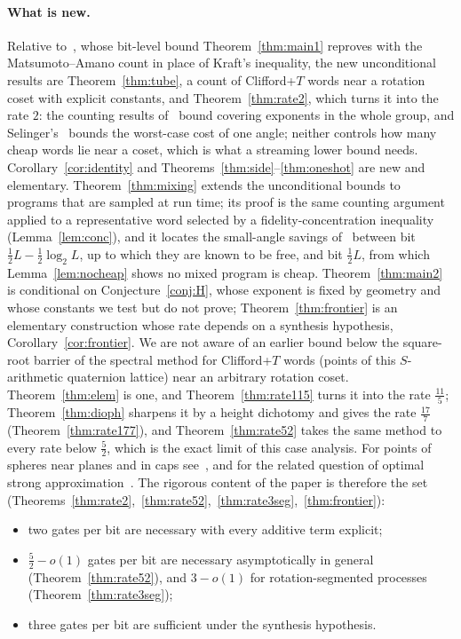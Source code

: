 \documentclass[aps,prx,twocolumn,superscriptaddress,nofootinbib,longbibliography]{revtex4-2}
\theoremstyle{plain}
\theoremstyle{definition}
\theoremstyle{remark}
\begin{document}
\paragraph{What is new.} Relative to~\cite{Paper1}, whose bit-level bound Theorem~\ref{thm:main1} reproves with the Matsumoto--Amano count in place of Kraft's inequality, the new unconditional results are Theorem~\ref{thm:tube}, a count of Clifford+$T$ words near a rotation coset with explicit constants, and Theorem~\ref{thm:rate2}, which turns it into the rate $2$: the counting results of~\cite{PS18} bound covering exponents in the whole group, and Selinger's~\cite[Thm.~30]{Selinger15} bounds the worst-case cost of one angle; neither controls how many cheap words lie near a coset, which is what a streaming lower bound needs. Corollary~\ref{cor:identity} and Theorems~\ref{thm:side}--\ref{thm:oneshot} are new and elementary. Theorem~\ref{thm:mixing} extends the unconditional bounds to programs that are sampled at run time; its proof is the same counting argument applied to a representative word selected by a fidelity-concentration inequality (Lemma~\ref{lem:conc}), and it locates the small-angle savings of~\cite{Bothe} between bit $\tfrac12L-\tfrac12\log_2L$, up to which they are known to be free, and bit $\tfrac12L$, from which Lemma~\ref{lem:nocheap} shows no mixed program is cheap. Theorem~\ref{thm:main2} is conditional on Conjecture~\ref{conj:H}, whose exponent is fixed by geometry and whose constants we test but do not prove; Theorem~\ref{thm:frontier} is an elementary construction whose rate depends on a synthesis hypothesis, Corollary~\ref{cor:frontier}. We are not aware of an earlier bound below the square-root barrier of the spectral method for Clifford+$T$ words (points of this $S$-arithmetic quaternion lattice) near an arbitrary rotation coset. Theorem~\ref{thm:elem} is one, and Theorem~\ref{thm:rate115} turns it into the rate $\tfrac{11}5$; Theorem~\ref{thm:dioph} sharpens it by a height dichotomy and gives the rate $\tfrac{17}7$ (Theorem~\ref{thm:rate177}), and Theorem~\ref{thm:rate52} takes the same method to every rate below $\tfrac52$, which is the exact limit of this case analysis. For points of spheres near planes and in caps see~\cite{BourgainRudnick}, and for the related question of optimal strong approximation~\cite{BKS,Sardari}. The rigorous content of the paper is therefore the set (Theorems~\ref{thm:rate2},~\ref{thm:rate52},~\ref{thm:rate3seg},~\ref{thm:frontier}):
\begin{itemize}\setlength\itemsep{0pt}
\item two gates per bit are necessary with every additive term explicit;
\item $\tfrac52-o(1)$ gates per bit are necessary asymptotically in general (Theorem~\ref{thm:rate52}), and $3-o(1)$ for rotation-segmented processes (Theorem~\ref{thm:rate3seg});
\item three gates per bit are sufficient under the synthesis hypothesis.
\end{itemize}
\end{document}
